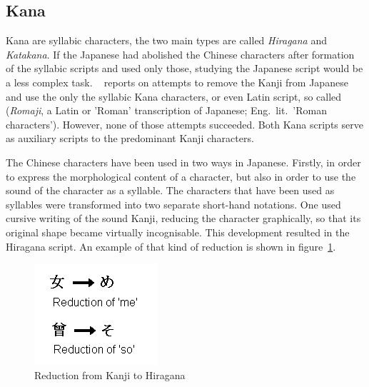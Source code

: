\subsection{Kana }
\label{sec:kana}

Kana are syllabic characters, the two main types are called \emph{Hiragana}
and \emph{Katakana}.
If the Japanese had abolished the Chinese characters after formation of the
syllabic scripts and used only those, studying the Japanese script would be
a less complex task.
~\citeyear{Lange1922} reports 
on attempts to remove the Kanji from Japanese and use the 
only the syllabic Kana characters, or even Latin script, 
so called  (\emph{Romaji}, a Latin or 'Roman' 
transcription of Japanese; Eng.\ lit.\ 'Roman characters'). 
However, none of those attempts succeeded. Both Kana scripts serve as 
auxiliary scripts to the predominant Kanji characters. 

The Chinese characters have been used in two ways in Japanese. 
Firstly, in order to express the morphological content of a character,
but also in order to use the sound of the character as a syllable.
The characters that have been used as syllables were transformed into two 
separate short-hand notations. 
One used cursive writing of the sound Kanji, reducing the character 
graphically, so that its original shape became virtually incognisable.
This development resulted in the Hiragana script. An example of that kind of 
reduction is shown in figure~\ref{fig:reductiontohiragana}.

\begin{figure}[htbp]
\begin{center}
\includegraphics[scale=0.7]{images/reductiontohiragana.png}
\caption{Reduction from Kanji to Hiragana}
\label{fig:reductiontohiragana}
\end{center}
\end{figure}

